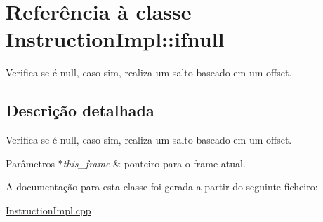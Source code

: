 \hypertarget{class_instruction_impl_1_1ifnull}{}\section{Referência à classe Instruction\+Impl\+:\+:ifnull}
\label{class_instruction_impl_1_1ifnull}


Verifica se é null, caso sim, realiza um salto baseado em um offset.  




\subsection{Descrição detalhada}
Verifica se é null, caso sim, realiza um salto baseado em um offset. 


\begin{DoxyParams}{Parâmetros}
{\em $\ast$this\+\_\+frame} & ponteiro para o frame atual.  \\
\hline
\end{DoxyParams}


A documentação para esta classe foi gerada a partir do seguinte ficheiro\+:\begin{DoxyCompactItemize}
\item 
\hyperlink{_instruction_impl_8cpp}{Instruction\+Impl.\+cpp}\end{DoxyCompactItemize}
